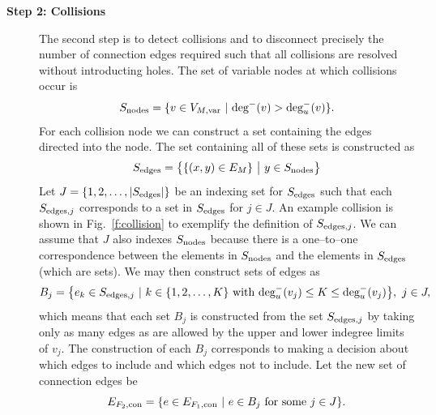 \begin{description}
    \item[\bf{Step 2: Collisions}] 
        The second step is to detect collisions and to disconnect precisely the number of connection edges required such that all collisions are resolved without introducting holes. 
        The set of variable nodes at which collisions occur is 
    \begin{equation}
    S_\textrm{nodes} = \{v \in V_{M,\textrm{var}} \ | \  \textrm{deg}^-(v) > \textrm{deg}_u^-(v) \}.
    \end{equation}
    For each collision node we can construct a set containing the edges directed into the node. The set containing all of these sets is constructed as
    \begin{equation}
        S_\textrm{edges} = \big \{ \{(x,y) \in E_M\} \ \big| \ y \in S_\textrm{nodes} \big \}
    \end{equation}
    Let $J=\{1,2,\ldots,|S_\textrm{edges}|\}$ be an indexing set for $S_\textrm{edges}$ such that each $S_{\textrm{edges},j}$ corresponds to a set in $S_\textrm{edges}$ for $j \in J$. 
    An example collision is shown in Fig.~\ref{f:collision} to exemplify the definition of $S_{\textrm{edges},j}$. 
    We can assume that $J$ also indexes $S_\textrm{nodes}$ because there is a one--to--one correspondence between the elements in $S_\textrm{nodes}$ and the elements in $S_\textrm{edges}$ (which are sets). 
    We may then construct sets of edges as
    \begin{equation}
    B_j = \big \{e_k \in S_{\textrm{edges},j} \ | \  k \in \{1,2,\ldots,K\} \textrm{ with } \textrm{deg}_u^-(v_j) \leq K \leq \textrm{deg}_u^-(v_j) \big \}, \ j \in J,
    \end{equation}
        which means that each set $B_j$ is constructed from the set $S_{\textrm{edges},j}$ by taking only as many edges as are allowed by the upper and lower indegree limits of $v_j$.  
The construction of each $B_j$ corresponds to making a decision about which edges to include and which edges not to include. 
Let the new set of connection edges be
    \begin{equation}
    E_{F_2,\txt{con}} = \{ e \in E_{F_1,\txt{con}} \st e \in B_j \txt{ for some } j \in J\}.

\end{equation}
\end{description}
